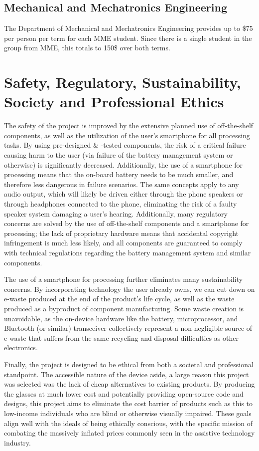 \documentclass[a4paper,11pt]{article}
\begin{document}
\subsection{Mechanical and Mechatronics Engineering}
The Department of Mechanical and Mechatronics Engineering provides up to \$75 per person per term for each MME student. Since there is a single student in the group from MME, this totals to 150\$ over both terms.

\newpage
\section{Safety, Regulatory, Sustainability, Society and Professional Ethics}
The safety of the project is improved by the extensive planned use of off-the-shelf components, as well as the utilization of the user's smartphone for all processing tasks. By using pre-designed \& -tested components, the risk of a critical failure causing harm to the user (via failure of the battery management system or otherwise) is significantly decreased. Additionally, the use of a smartphone for processing means that the on-board battery needs to be much smaller, and therefore less dangerous in failure scenarios. The same concepts apply to any audio output, which will likely be driven either through the phone speakers or through headphones connected to the phone, eliminating the risk of a faulty speaker system damaging a user's hearing. Additionally, many regulatory concerns are solved by the use of off-the-shelf components and a smartphone for processing; the lack of proprietary hardware means that accidental copyright infringement is much less likely, and all components are guaranteed to comply with technical regulations regarding the battery management system and similar components.
\par
The use of a smartphone for processing further eliminates many sustainability concerns. By incorporating technology the user already owns, we can cut down on e-waste produced at the end of the product's life cycle, as well as the waste produced as a byproduct of component manufacturing. Some waste creation is unavoidable, as the on-device hardware like the battery, microprocessor, and Bluetooth (or similar) transceiver collectively represent a non-negligible source of e-waste that suffers from the same recycling and disposal difficulties as other electronics.
\par
Finally, the project is designed to be ethical from both a societal and professional standpoint. The accessible nature of the device aside, a large reason this project was selected was the lack of cheap alternatives to existing products. By producing the glasses at much lower cost and potentially providing open-source code and designs, this project aims to eliminate the cost barrier of products such as this to low-income individuals who are blind or otherwise visually impaired. These goals align well with the ideals of being ethically conscious, with the specific mission of combating the massively inflated prices commonly seen in the assistive technology industry.
\end{document}
